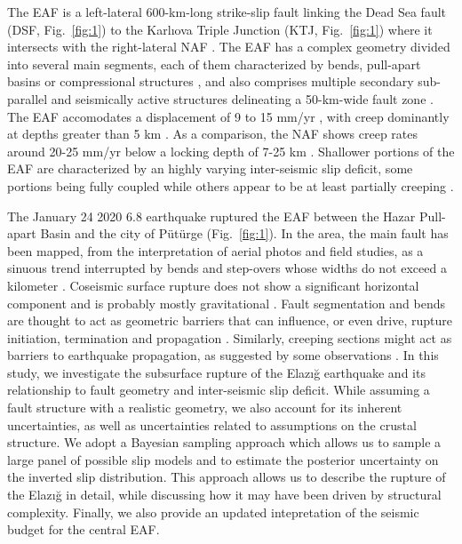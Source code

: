 \documentclass[breakmath]{seismica}
\begin{document}
	The EAF is a left-lateral 600-km-long strike-slip fault linking the Dead Sea fault (DSF, Fig.~\ref{fig:1}) to the Karl{\i}ova Triple Junction (KTJ, Fig.~\ref{fig:1}) where it intersects with the right-lateral NAF \citep{yilmaz_kinematics_2006,duman_east_2013}. The EAF has a complex geometry divided into several main segments, each of them characterized by bends, pull-apart basins or compressional structures \citep{duman_east_2013}, and also comprises multiple secondary sub-parallel and seismically active structures delineating a 50-km-wide fault zone \citep{bulut_east_2012}. The EAF accomodates a displacement of 9 to 15 mm/yr \citep{cetin_paleoseismology_2003,reilinger_gps_2006,cavalie_block-like_2014,aktug_slip_2016,bletery_distribution_2020-1}, with creep dominantly at depths greater than 5 km \citep{cavalie_block-like_2014,bletery_distribution_2020-1}. As a comparison, the NAF shows creep rates around 20-25 mm/yr below a locking depth of 7-25 km \citep{cakir_insar_2014-1,hussain_constant_2018,kaneko_interseismic_2013,walters_interseismic_2011,wright_measurement_2001}. Shallower portions of the EAF are characterized by an highly varying inter-seismic slip deficit, some portions being fully coupled while others appear to be at least partially creeping \citep{bletery_distribution_2020-1}. 
	
	The January 24 2020 6.8 earthquake ruptured the EAF between the Hazar Pull-apart Basin and the city of P\"{u}t\"{u}rge (Fig.~\ref{fig:1}). In the area, the main fault has been mapped, from the interpretation of aerial photos and field studies, as a sinuous trend interrupted by bends and step-overs whose widths do not exceed a kilometer \citep{duman_east_2013}. Coseismic surface rupture does not show a significant horizontal component and is probably mostly gravitational \citep{tatar_surface_2020}.
		Fault segmentation and bends are thought to act as geometric barriers that can influence, or even drive, rupture initiation, termination and propagation \citep{king_role_1985,barka_strike-slip_1988,wesnousky_predicting_2006,duan_multicycle_2005,aochi_effect_2002}. Similarly, creeping sections might act as barriers to earthquake propagation, as suggested by some observations \citep{king_speculations_1986,chlieh_heterogeneous_2008,perfettini_seismic_2010,kaneko_towards_2010}. 
	In this study, we investigate the subsurface rupture of the Elaz{\i}\u{g} earthquake and its relationship to fault geometry and inter-seismic slip deficit. While assuming a fault structure with a realistic geometry, we also account for its inherent uncertainties, as well as uncertainties related to assumptions on the crustal structure. We adopt a Bayesian sampling approach which allows us to sample a large panel of possible slip models and to estimate the posterior uncertainty on the inverted slip distribution. This approach allows us to describe the rupture of the Elaz{\i}\u{g} in detail, while discussing how it may have been driven by structural complexity. Finally, we also provide an updated intepretation of the seismic budget for the central EAF.
	
\end{document}

